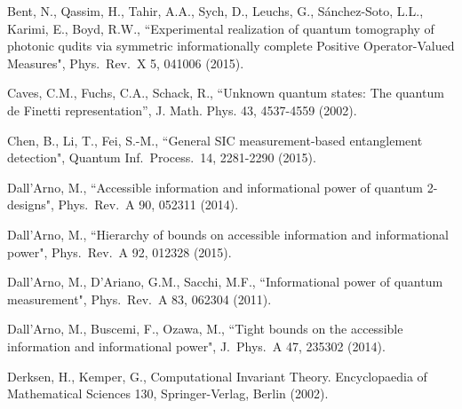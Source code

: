\documentclass[11pt]{article}
\theoremstyle{remark}
\theoremstyle{definition}
\begin{document}
\begin{thebibliography}{99}



 Bent, N., Qassim, H., Tahir, A.A., Sych, D., Leuchs, G., S\'anchez-Soto, L.L.,  Karimi, E., Boyd, R.W., ``Experimental realization of quantum tomography of photonic qudits via symmetric
  informationally complete Positive Operator-Valued Measures", Phys.\ Rev.\ X 5, 041006 (2015).


 Caves, C.M., Fuchs, C.A., Schack, R., ``Unknown quantum states: The quantum de Finetti representation'', J. Math. Phys. 43, 4537-4559 (2002).

 Chen, B., Li, T., Fei, S.-M., ``General SIC measurement-based entanglement detection", Quantum Inf.\ Process.\ 14, 2281-2290 (2015).

 Dall'Arno, M., ``Accessible information and informational power of quantum 2-designs", Phys.\ Rev.\ A 90, 052311 (2014).

 Dall'Arno, M., ``Hierarchy of bounds on accessible information and informational power", Phys.\ Rev.\ A 92, 012328 (2015).

 Dall'Arno, M., D'Ariano, G.M., Sacchi, M.F., ``Informational power of quantum measurement", Phys.\ Rev.\ A 83, 062304 (2011).

 Dall'Arno, M., Buscemi, F., Ozawa, M., ``Tight bounds on the accessible information and informational power", J.\ Phys.\ A 47, 235302 (2014).

Derksen, H., Kemper, G., Computational Invariant
Theory. Encyclopaedia of Mathematical Sciences 130, Springer-Verlag,
Berlin (2002).




\end{thebibliography}
\end{document}
